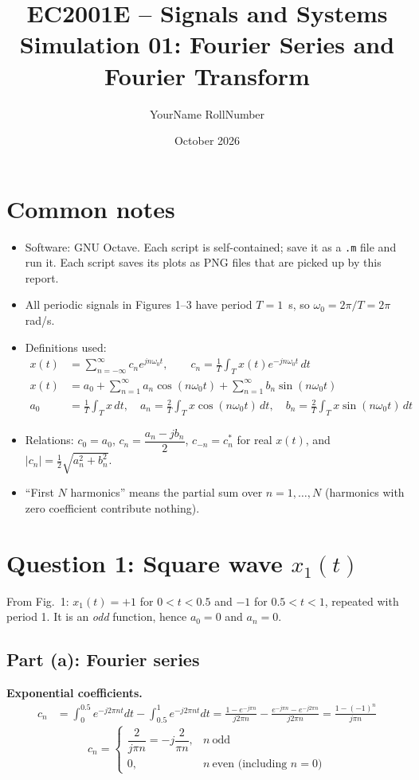\documentclass[11pt,a4paper]{article}
\title{EC2001E -- Signals and Systems\\Simulation 01: Fourier Series and Fourier Transform}
\author{YourName \quad RollNumber}
\date{October 2026}
\begin{document}
\maketitle

\section*{Common notes}
\begin{itemize}
  \item Software: GNU Octave. Each script is self-contained; save it as a \texttt{.m} file and run it. Each script saves its plots as PNG files that are picked up by this report.
  \item All periodic signals in Figures 1--3 have period $T=1$~s, so $\omega_0 = 2\pi/T = 2\pi$ rad/s.
  \item Definitions used:
  \begin{align*}
    x(t) &= \sum_{n=-\infty}^{\infty} c_n e^{jn\omega_0 t}, \qquad c_n = \frac1T\int_T x(t)e^{-jn\omega_0 t}\,dt\\
    x(t) &= a_0 + \sum_{n=1}^{\infty} a_n\cos(n\omega_0 t) + \sum_{n=1}^{\infty} b_n\sin(n\omega_0 t)\\
    a_0 &= \frac1T\int_T x\,dt,\quad a_n = \frac2T\int_T x\cos(n\omega_0 t)\,dt,\quad b_n=\frac2T\int_T x\sin(n\omega_0 t)\,dt
  \end{align*}
  \item Relations: $c_0=a_0$, $c_n=\dfrac{a_n-jb_n}{2}$, $c_{-n}=c_n^*$ for real $x(t)$, and $|c_n|=\tfrac12\sqrt{a_n^2+b_n^2}$.
  \item ``First $N$ harmonics'' means the partial sum over $n=1,\dots,N$ (harmonics with zero coefficient contribute nothing).
\end{itemize}

\section{Question 1: Square wave $x_1(t)$}
From Fig.~1: $x_1(t)=+1$ for $0<t<0.5$ and $-1$ for $0.5<t<1$, repeated with period 1. It is an \emph{odd} function, hence $a_0=0$ and $a_n=0$.

\subsection{Part (a): Fourier series}
\textbf{Exponential coefficients.}
\begin{align*}
c_n &= \int_0^{0.5}e^{-j2\pi nt}dt-\int_{0.5}^{1}e^{-j2\pi nt}dt
 = \frac{1-e^{-j\pi n}}{j2\pi n}-\frac{e^{-j\pi n}-e^{-j2\pi n}}{j2\pi n}
 = \frac{1-(-1)^n}{j\pi n}
\end{align*}
\[
c_n=\begin{cases}\dfrac{2}{j\pi n}=-j\dfrac{2}{\pi n}, & n\ \text{odd}\\[2mm] 0, & n\ \text{even (including } n=0)\end{cases}
\]
\end{document}
